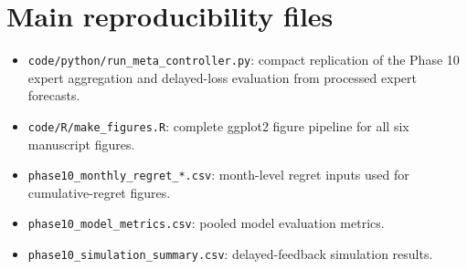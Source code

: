 \section{Main reproducibility files}\label{main-reproducibility-files}

\begin{itemize}
\item
  \texttt{code/python/run\_meta\_controller.py}: compact replication of the Phase 10
  expert aggregation and delayed-loss evaluation from processed expert
  forecasts.
\item
  \texttt{code/R/make\_figures.R}: complete ggplot2 figure pipeline for all six
  manuscript figures.
\item
  \texttt{phase10\_monthly\_regret\_*.csv}: month-level regret inputs used for
  cumulative-regret figures.
\item
  \texttt{phase10\_model\_metrics.csv}: pooled model evaluation metrics.
\item
  \texttt{phase10\_simulation\_summary.csv}: delayed-feedback simulation results.
\end{itemize}
